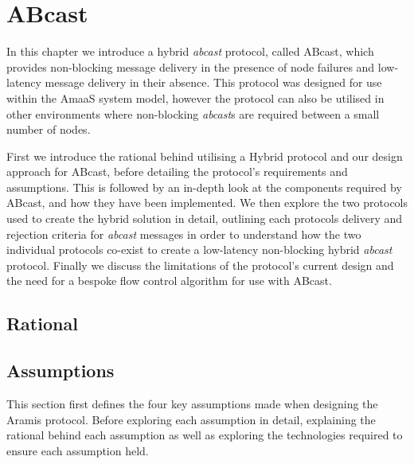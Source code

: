 \chapter{ABcast}

    \graphicspath{{Chapter4-ABcast/Figs/Vector/}{Chapter4-ABcast/Figs/}}

In this chapter we  introduce a hybrid \emph{abcast} protocol, called \textsf{ABcast}, which provides non-blocking message delivery in the presence of node failures and low-latency message delivery in their absence.  This protocol was designed for use within the \textsf{AmaaS} system model, however the protocol can also be utilised in other environments where non-blocking \emph{abcast}s are required between a small number of nodes.  

First we introduce the rational behind utilising a Hybrid protocol and our design approach for \textsf{ABcast}, before detailing the protocol's requirements and assumptions.  This is followed by an in-depth look at the components required by \textsf{ABcast}, and how they have been implemented.  We then explore the two protocols used to create the hybrid solution in detail, outlining each protocols delivery and rejection criteria for \emph{abcast} messages in order to understand how the two individual protocols co-exist to create a low-latency non-blocking hybrid \emph{abcast} protocol.  Finally we discuss the limitations of the protocol's current design and the need for a bespoke flow control algorithm for use with \textsf{ABcast}.  

\section{Rational}
	
	
\newpage
\section{Assumptions}
	This section first defines the four key assumptions made when designing the \textsf{Aramis} protocol.  Before exploring each assumption in detail, explaining the rational behind each assumption as well as exploring the technologies required to ensure each assumption held.  

